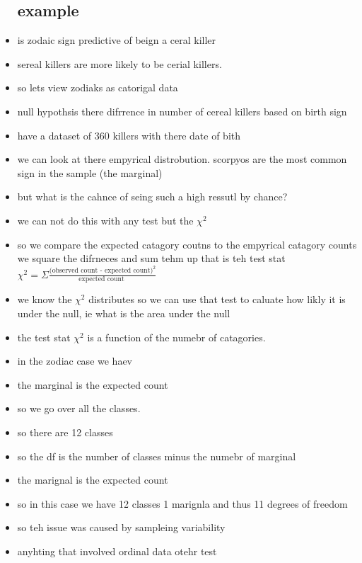 \documentclass{article}
\begin{document}
\begin{itemize}
\subsection{example}
\item is zodaic sign predictive of beign a ceral killer
\item sereal killers are more likely to be cerial killers.
\item so lets view zodiaks as catorigal data 
\item null hypothsis there difrrence in number of cereal killers based on birth sign 
\item have a dataset of 360 killers with there date of bith 
\item we can look at there empyrical distrobution. scorpyos are the most common sign in the sample (the marginal)
\item but what is the cahnce of seing such a high ressutl by chance? 
\item we can not do this with any test but the $\chi ^2$
\item so we compare the expected catagory coutns to the empyrical catagory counts we square the difrneces and sum tehm up that is teh test stat $\chi^2=\Sigma\frac{\text{(observed count - expected count})^2}{\text{expected count }}$
\item we know the $\chi^2$ distributes so we can use that test to caluate how likly it is under the null, ie what is the area under the null 
\item the test stat $\chi^2$ is a function of the numebr of catagories. \item in the zodiac case we haev 
\item the marginal is the expected count
\item so we go over all the classes. 
\item so there are 12 classes 
\item so the df is the number of classes minus the numebr of marginal 
\item the marignal is the expected count 
\item so in this case we have 12 classes 1 marignla and thus 11 degrees of freedom 
\item so teh issue was caused by sampleing variability
\item anyhting that involved ordinal data otehr test

\end{itemize}
\end{document}
